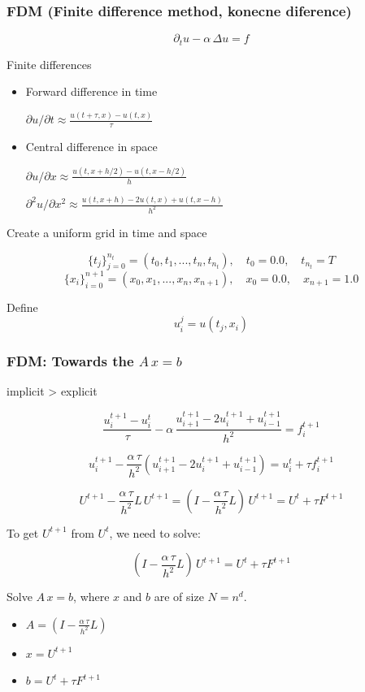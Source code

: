 \documentclass{beamer}
\begin{document}
\begin{frame}
\frametitle{FDM (Finite difference method, konecne diference)}

$$ \partial_t u - \alpha\,\Delta u = f $$

\pause
Finite differences
\begin{itemize}

\item Forward difference in time

$\partial u / \partial t \approx \frac{u(t+\tau,x) - u(t,x)}{\tau} $

\item Central difference in space

$\partial u / \partial x \approx \frac{u(t,x+h/2) - u(t,x-h/2)}{h} $

$\partial^2 u /\partial x^2 \approx \frac{u(t,x+h) - 2u(t,x) + u(t,x-h)}{h^2} $

\end{itemize}

\pause
Create a uniform grid in time and space

$$ \{t_j\}_{j=0}^{n_t} = (t_0, t_1, ..., t_n, t_{n_t}), \quad t_0 = 0.0, \quad t_{n_t} = T $$
$$ \{x_i\}_{i=0}^{n+1} = (x_0, x_1, ..., x_n, x_{n+1}), \quad x_0 = 0.0, \quad x_{n+1} = 1.0 $$

\pause
Define
$$ u^j_i = u(t_j, x_i) $$



\end{frame}

\begin{frame}
\frametitle{FDM: Towards the $A\,x=b$}

implicit > explicit %

\pause
$$
\frac{u_i^{t+1} - u_i^{t}}{\tau}
- \alpha\, \frac{u_{i+1}^{t+1} - 2u_i^{t+1} + u_{i-1}^{t+1}}{h^2} = f_i^{t+1}
$$

$$
u_i^{t+1} -
\frac{\alpha\,\tau}{h^2} (u_{i+1}^{t+1} - 2u_i^{t+1} + u_{i-1}^{t+1})
= u_i^{t} + \tau f_i^{t+1}
$$

\pause
$$
U^{t+1} -
\frac{\alpha\,\tau}{h^2} L\,U^{t+1}
= (I - \frac{\alpha\,\tau}{h^2} L)\, U^{t+1}
= U^t + \tau F^{t+1}
$$

\pause
To get $U^{t+1}$ from $U^{t}$, we need to solve:

$$
(I - \frac{\alpha\,\tau}{h^2} L)\, U^{t+1}
= U^t + \tau F^{t+1}
$$

\pause
Solve $A\,x=b$, where $x$ and $b$ are of size $N=n^d$.
\begin{itemize}
\item $A = (I - \frac{\alpha\,\tau}{h^2} L)$
\item $x = U^{t+1}$
\item $b = U^t + \tau F^{t+1}$
\end{itemize}

\end{frame}
\end{document}
